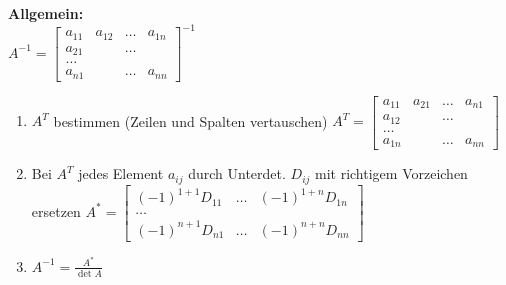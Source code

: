 \textbf{Allgemein:}\\
	$A^{-1}= \begin{bmatrix}
    	a_{11} & a_{12}& \ldots & a_{1n}\\
    	a_{21}& &\ldots & \\
    	\ldots \\
    	a_{n1} & & \ldots & a_{nn}    			
    \end{bmatrix}^{-1}$
	\begin{enumerate}
		\item $A^T$ bestimmen (Zeilen und Spalten vertauschen) $A^{T}= \begin{bmatrix}
    	a_{11} & a_{21}& \ldots & a_{n1}\\
    	a_{12}& &\ldots & \\
    	\ldots \\
    	a_{1n} & & \ldots & a_{nn}    			
    \end{bmatrix}$	
		\item Bei $A^T$ jedes Element $a_{ij}$ durch Unterdet. $D_{ij}$ mit
		richtigem Vorzeichen ersetzen $A^*=	\begin{bmatrix}
			(-1)^{1+1}D_{11} &  \ldots	& (-1)^{1+n} D_{1n}\\
			\ldots\\
			(-1)^{n+1} D_{n1}& \ldots  & (-1)^{n+n} D_{nn}
		\end{bmatrix}$
		\item $A^{-1} = \frac{A^*}{\det A}$ 
    \end{enumerate}
 
